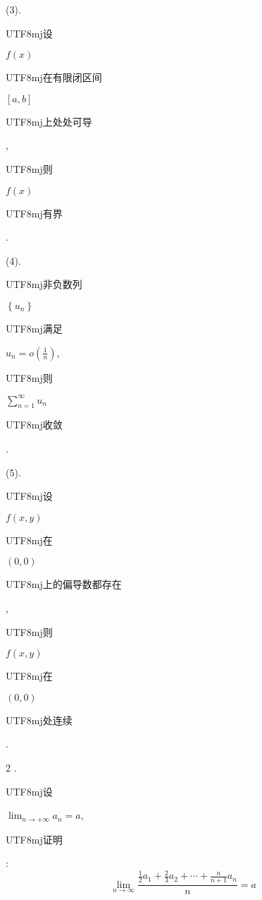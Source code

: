 \documentclass[10pt]{article}
\begin{document}
(3). \begin{CJK}{UTF8}{mj}设\end{CJK} $f(x)$ \begin{CJK}{UTF8}{mj}在有限闭区间\end{CJK} $[a, b]$ \begin{CJK}{UTF8}{mj}上处处可导\end{CJK}, \begin{CJK}{UTF8}{mj}则\end{CJK} $f(x)$ \begin{CJK}{UTF8}{mj}有界\end{CJK}.

(4). \begin{CJK}{UTF8}{mj}非负数列\end{CJK} $\left\{u_{n}\right\}$ \begin{CJK}{UTF8}{mj}满足\end{CJK} $u_{n}=o\left(\frac{1}{n}\right)$, \begin{CJK}{UTF8}{mj}则\end{CJK} $\sum_{n=1}^{\infty} u_{n}$ \begin{CJK}{UTF8}{mj}收敛\end{CJK}.

(5). \begin{CJK}{UTF8}{mj}设\end{CJK} $f(x, y)$ \begin{CJK}{UTF8}{mj}在\end{CJK} $(0,0)$ \begin{CJK}{UTF8}{mj}上的偏导数都存在\end{CJK}, \begin{CJK}{UTF8}{mj}则\end{CJK} $f(x, y)$ \begin{CJK}{UTF8}{mj}在\end{CJK} $(0,0)$ \begin{CJK}{UTF8}{mj}处连续\end{CJK}.

2 . \begin{CJK}{UTF8}{mj}设\end{CJK} $\lim _{n \rightarrow+\infty} a_{n}=a$, \begin{CJK}{UTF8}{mj}证明\end{CJK}:
$$
\lim _{n \rightarrow \infty} \frac{\frac{1}{2} a_{1}+\frac{2}{3} a_{2}+\cdots+\frac{n}{n+1} a_{n}}{n}=a
$$
\end{document}
